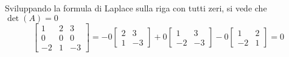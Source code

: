 \begin{es}
  \label{es:prodeldet6}
  Sviluppando la formula di Laplace sulla riga con tutti zeri, si vede
  che $\det(A)=0$
  \begin{equation*}
    \begin{bmatrix}
      1 & 2 & 3\\
      0 & 0 & 0\\
      -2 & 1 & -3
    \end{bmatrix} = -0
    \begin{bmatrix}
      2 & 3\\
      1 & -3
    \end{bmatrix}+ 0
    \begin{bmatrix}
      1 & 3\\
      -2 & -3
    \end{bmatrix}-0
    \begin{bmatrix}
      1 & 2 \\
      -2 & 1
    \end{bmatrix}= 0
  \end{equation*}
\end{es}
